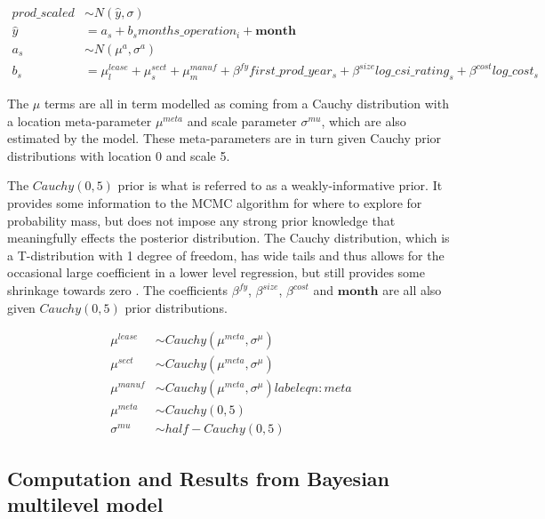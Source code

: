 \documentclass[12pt]{article}
\begin{document}
\begin{equation}
\begin{aligned}
prod\_scaled &\sim N(\hat{y}, \sigma)\\ %
\hat{y} &= a_s + b_s months\_operation_i + \mathbf{month}\\ %
a_s &\sim N(\mu^a, \sigma^a) \label{eqn:bayesMod}\\ %
b_s & = \mu^{lease}_l + \mu^{sect}_s + \mu^{manuf}_m + \beta^{fy} first\_prod\_year_s + \beta^{size} log\_csi\_rating_s + \beta^{cost} log\_cost_s
\end{aligned}
\end{equation}

The $\mu$ terms are all in term modelled as coming from a Cauchy distribution with a location meta-parameter $\mu^{meta}$ and scale parameter $\sigma^{mu}$, which are also estimated by the model. These meta-parameters are in turn given Cauchy prior distributions with location 0 and scale 5.

The $Cauchy(0,5)$ prior is what is referred to as a weakly-informative prior. It provides some information to the MCMC algorithm for where to explore for probability mass, but does not impose any strong prior knowledge that meaningfully effects the posterior distribution. The Cauchy distribution, which is a T-distribution with 1 degree of freedom, has wide tails and thus allows for the occasional large coefficient in a lower level regression, but still provides some shrinkage towards zero \citep{gelman_weakly_2008}.  The coefficients $\beta^{fy}$, $\beta^{size}$, $\beta^{cost}$ and $\mathbf{month}$ are all also given $Cauchy(0,5)$ prior distributions.

\begin{equation}
\begin{aligned}
\mu^{lease} &\sim Cauchy(\mu^{meta}, \sigma^{\mu}) \\ %
\mu^{sect} &\sim Cauchy(\mu^{meta}, \sigma^{\mu}) \\ %
\mu^{manuf} &\sim Cauchy(\mu^{meta}, \sigma^{\mu}) label{eqn:meta} \\ %
\mu^{meta} &\sim Cauchy(0, 5) \\ %
\sigma^{mu} &\sim half-Cauchy(0,5) %
\end{aligned}
\end{equation}

\subsection{Computation and Results from Bayesian multilevel model}
\end{document}
